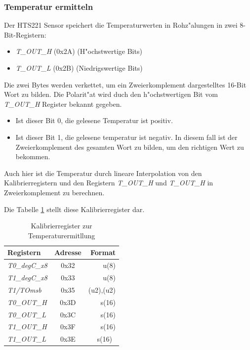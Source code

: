 \subsubsection{Temperatur ermitteln}
Der HTS221 Sensor speichert die Temperaturwerten in Rohz"alungen in zwei 8-Bit-Registern:

\begin{itemize}
	\item \textit{T\_OUT\_H} (0x2A) (H"ochstwertige Bits)
	\item \textit{T\_OUT\_L} (0x2B) (Niedrigswertige Bits)
\end{itemize}

Die zwei Bytes werden verkettet, um ein Zweierkomplement dargestelltes 16-Bit Wort zu bilden. Die Polarit"at wird duch den h"ochstwertigen Bit vom \textit{T\_OUT\_H} Register bekannt gegeben.

\begin{itemize}
	\item Ist dieser Bit 0, die gelesene Temperatur ist positiv.
	\item Ist dieser Bit 1, die gelesene temperatur ist negativ. In diesem fall ist der Zweierkomplement des gesamten Wort zu bilden, um den richtigen Wert zu bekommen.
\end{itemize}

\vspace{2cm}
Auch hier ist die Temperatur durch lineare Interpolation von den Kalibrierregistern und den Registern \textit{T\_OUT\_H} und \textit{T\_OUT\_H} in Zweierkomplement zu berechnen.

Die Tabelle \ref{tab:Reg_T} stellt diese Kalibrierregister dar.

\begin{center}
	\begin{table}[htbp] 
		\centering 
		\Large
		\begin{tabular}{l|c|r}
			\textbf{Registern} & \textbf{Adresse} & \textbf{Format} \\
			\hline
			\textit{T0\_degC\_x8} & 0x32	& u(8) \\
			\hline
			\textit{T1\_degC\_x8} & 0x33	& u(8)\\
			\hline
			\textit{T1/TOmsb} & 0x35	& (u2),(u2)\\
			\hline
			\textit{T0\_OUT\_H} 	& 0x3D  & s(16)\\
			\hline
			\textit{T0\_OUT\_L} 	& 0x3C  & s(16)\\
			\hline
			\textit{T1\_OUT\_H}	& 0x3F	& s(16)\\
			\hline
			\textit{T1\_OUT\_L} 	& 0x3E  & s(16)\
		\end{tabular} 
		\caption{Kalibrierregister zur Temperaturermitllung} 
		\label{tab:Reg_T} 
		
	\end{table}
\end{center}

